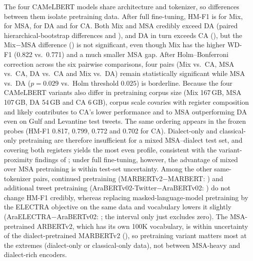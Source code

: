 \documentclass[11pt]{article}
\begin{document}
The four CAMeLBERT models share architecture and tokenizer, so differences between them isolate pretraining data. After full fine-tuning, HM-F1 is \pidHMCAMeLBERTMix{} for Mix, \pidHMCAMeLBERTMSA{} for MSA, \pidHMCAMeLBERTDA{} for DA and \pidHMCAMeLBERTCA{} for CA. Both Mix and MSA credibly exceed DA (paired hierarchical-bootstrap differences \pdCAMeLBERTMixCAMeLBERTDAHM{} and \pdCAMeLBERTMSACAMeLBERTDAHM), and DA in turn exceeds CA (\pdCAMeLBERTDACAMeLBERTCAHM), but the Mix$-$MSA difference (\pdCAMeLBERTMixCAMeLBERTMSAHM) is not significant, even though Mix has the higher WD-F1 (0.822 vs.\ 0.771) and a much smaller MSA gap. After Holm--Bonferroni correction across the six pairwise comparisons, four pairs (Mix vs.\ CA, MSA vs.\ CA, DA vs.\ CA and Mix vs.\ DA) remain statistically significant while MSA vs.\ DA ($p=0.029$ vs.\ Holm threshold $0.025$) is borderline. Because the four CAMeLBERT variants also differ in pretraining corpus size (Mix 167\,GB, MSA 107\,GB, DA 54\,GB and CA 6\,GB), corpus scale covaries with register composition and likely contributes to CA's lower performance and to MSA outperforming DA even on Gulf and Levantine test tweets. The same ordering appears in the frozen probes (HM-F1 0.817, 0.799, 0.772 and 0.702 for CA). Dialect-only and classical-only pretraining are therefore insufficient for a mixed MSA--dialect test set, and covering both registers yields the most even profile, consistent with the variant-proximity findings of \cite{inoue2021interplay}; under full fine-tuning, however, the advantage of mixed over MSA pretraining is within test-set uncertainty. Among the other same-tokenizer pairs, continued pretraining (MARBERTv2$-$MARBERT: \pdMARBERTvMARBERTHM) and additional tweet pretraining (AraBERTv02-Twitter$-$AraBERTv02: \pdAraBERTvTwitterAraBERTvHM) do not change HM-F1 credibly, whereas replacing masked-language-model pretraining by the ELECTRA objective on the same data and vocabulary lowers it slightly (AraELECTRA$-$AraBERTv02: \pdAraELECTRAAraBERTvHM; the interval only just excludes zero). The MSA-pretrained ARBERTv2, which has its own 100K vocabulary, is within uncertainty of the dialect-pretrained MARBERTv2 (\pdARBERTvMARBERTvHM), so pretraining variant matters most at the extremes (dialect-only or classical-only data), not between MSA-heavy and dialect-rich encoders.
\end{document}
